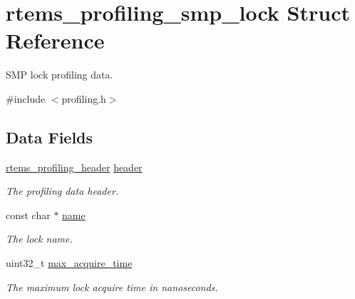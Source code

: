 \hypertarget{structrtems__profiling__smp__lock}{}\section{rtems\+\_\+profiling\+\_\+smp\+\_\+lock Struct Reference}
\label{structrtems__profiling__smp__lock}


S\+MP lock profiling data.  




{\ttfamily \#include $<$profiling.\+h$>$}

\subsection*{Data Fields}
\begin{DoxyCompactItemize}
\item 
\mbox{\label{structrtems__profiling__smp__lock_a65cd2bfc0e95013b45f1ec9bb7655c6d}} 
\mbox{\hyperlink{structrtems__profiling__header}{rtems\+\_\+profiling\+\_\+header}} \mbox{\hyperlink{structrtems__profiling__smp__lock_a65cd2bfc0e95013b45f1ec9bb7655c6d}{header}}
\begin{DoxyCompactList}\small\item\em The profiling data header. \end{DoxyCompactList}\item 
\mbox{\label{structrtems__profiling__smp__lock_a5095e2c158c1f4a48febacf3838191c6}} 
const char $\ast$ \mbox{\hyperlink{structrtems__profiling__smp__lock_a5095e2c158c1f4a48febacf3838191c6}{name}}
\begin{DoxyCompactList}\small\item\em The lock name. \end{DoxyCompactList}\item 
\mbox{\label{structrtems__profiling__smp__lock_a5000fabb0d4db35434b4781f19985e19}} 
uint32\+\_\+t \mbox{\hyperlink{structrtems__profiling__smp__lock_a5000fabb0d4db35434b4781f19985e19}{max\+\_\+acquire\+\_\+time}}
\begin{DoxyCompactList}\small\item\em The maximum lock acquire time in nanoseconds. \end{DoxyCompactList}\item 

\end{DoxyCompactItemize}
